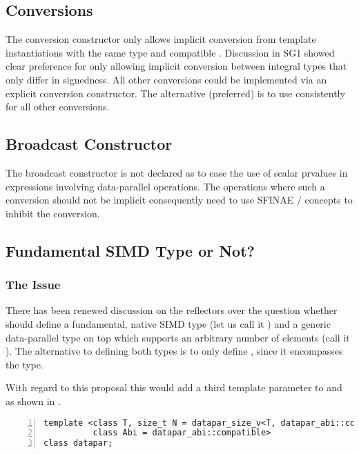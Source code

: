 \subsection{Conversions}
The \datapar conversion constructor only allows implicit conversion from \datapar template instantiations with the same  type and compatible .
Discussion in SG1 showed clear preference for only allowing implicit conversion between integral types that only differ in signedness.
All other conversions could be implemented via an explicit conversion constructor.
The alternative (preferred) is to use \simdcast consistently for all other conversions.

\subsection{Broadcast Constructor}
The broadcast constructor is not declared as  to ease the use of scalar prvalues in expressions involving data-parallel operations.
The operations where such a conversion should not be implicit consequently need to use SFINAE / concepts to inhibit the conversion.

\subsection{Fundamental SIMD Type or Not?}
\subsubsection{The Issue}
There has been renewed discussion on the reflectors over the question whether \CC{} should define a fundamental, native SIMD type (let us call it ) and a generic data-parallel type on top which supports an arbitrary number of elements (call it ).
The alternative to defining both types is to only define , since it encompasses the  type.

With regard to this proposal this would add a third template parameter to \datapar and \mask as shown in .
\begin{lstlisting}[style=Vc,numbers=left,float,label=lst:datapar N,caption={
  Possible declaration of the class template parameters of a generic (i.e. \type{arbitrary}) \datapar class.
}]
template <class T, size_t N = datapar_size_v<T, datapar_abi::compatible>,
          class Abi = datapar_abi::compatible>
class datapar;
\end{lstlisting}

